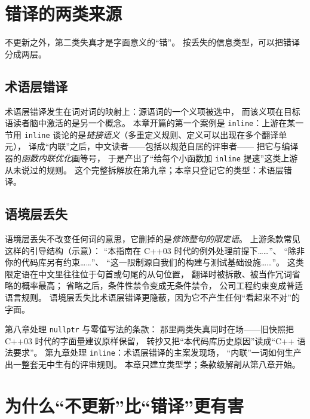 \documentclass[12pt,a4paper,fontset=fandol]{ctexbook}
\newcommand{\cpp}[1]{C++#1}
\newcommand{\Tp}[1]{\texttt{#1}}
\begin{document}
\section{错译的两类来源}
\label{sec:ch07-mistrans}

不更新之外，第二类失真才是字面意义的``错''。
按丢失的信息类型，可以把错译分成两层。

\subsection{术语层错译}
\label{sec:ch07-term}

术语层错译发生在词对词的映射上：源语词的一个义项被选中，
而该义项在目标语读者脑中激活的是另一个概念。
本章开篇的第一个案例是 \Tp{inline}：上游在某一节用 \Tp{inline}
谈论的是\emph{链接语义}（多重定义规则、定义可以出现在多个翻译单元），
译成``内联''之后，中文读者——包括以规范自居的评审者——
把它与编译器的\emph{函数内联优化}画等号，
于是产出了``给每个小函数加 \Tp{inline} 提速''这类上游从未说过的规则。
这个完整拆解放在第九章；本章只登记它的类型：术语层错译。

\subsection{语境层丢失}
\label{sec:ch07-context}

语境层丢失不改变任何词的意思，它删掉的是\emph{修饰整句的限定语}。
上游条款常见这样的引导结构（示意）：
``本指南在 \cpp{03} 时代的例外处理前提下……''、
``除非你的代码库另有约束……''、
``这一限制源自我们的构建与测试基础设施……''。
这类限定语在中文里往往位于句首或句尾的从句位置，
翻译时被拆散、被当作冗词省略的概率最高；
省略之后，条件性禁令变成无条件禁令，
公司工程约束变成普适语言规则。
语境层丢失比术语层错译更隐蔽，因为它不产生任何``看起来不对''的字面。

\begin{note}[title={后续两章正好各解剖一个案例}]
  第八章处理 \Tp{nullptr} 与零值写法的条款：
  那里两类失真同时在场——旧快照把 \cpp{03} 时代的字面量建议原样保留，
  转抄又把``本代码库历史原因''读成``\cpp{} 语法要求''。
  第九章处理 \Tp{inline}：术语层错译的主案发现场，
  ``内联''一词如何生产出一整套无中生有的评审规则。
  本章只建立类型学；条款级解剖从第八章开始。
\end{note}

\section{为什么``不更新''比``错译''更有害}
\label{sec:ch07-stale}
\end{document}

